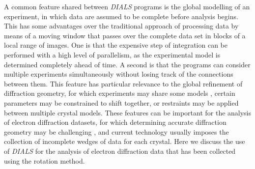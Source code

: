 \documentclass[preprint]{iucr}
\newcommand{\dials}{\emph{DIALS}\xspace}
\newcounter{MCCounter}
\newcommand{\MC}[1]{%
   \stepcounter{MCCounter}%
   {\color{blue}{\textbf{MC \#\arabic{MCCounter}: }#1}}%
  }
\begin{document}

A common feature shared between \dials programs is the global modelling of an
experiment, in which data are assumed to be complete before analysis begins.
This has some advantages over the traditional approach of processing data by
means of a moving window that passes over the complete data set in blocks of a
local range of images. One is that the expensive step of integration can be
performed with a high level of parallelism, as the experimental model is
determined completely ahead of time. A second is that the programs can consider
multiple experiments simultaneously without losing track of the connections
between them. This feature has particular relevance to the global refinement of
diffraction geometry, for which experiments may share some models
\cite{Waterman2016}, certain parameters may be constrained to shift together,
or restraints may be applied between multiple crystal models. These features
can be important for the analysis of electron diffraction datasets, for which
determining accurate diffraction geometry may be challenging
\cite{review_adt_red:2015}, and current technology usually imposes the
collection of incomplete wedges of data for each crystal. Here we discuss the
use of \dials for the analysis of electron diffraction data that has been
collected using the rotation method.
\end{document}
